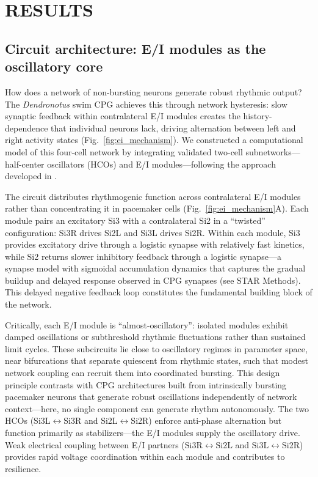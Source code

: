 \section*{RESULTS}

\subsection{Circuit architecture: E/I modules as the oscillatory core}

How does a network of non-bursting neurons generate robust rhythmic output?
The \textit{Dendronotus} swim CPG achieves this through network hysteresis: slow synaptic feedback within contralateral E/I modules creates the history-dependence that individual neurons lack, driving alternation between left and right activity states (Fig.~\ref{fig:ei_mechanism}).
We constructed a computational model of this four-cell network by integrating validated two-cell subnetworks---half-center oscillators (HCOs) and E/I modules---following the approach developed in \cite{scully2024pairing}.

The circuit distributes rhythmogenic function across contralateral E/I modules rather than concentrating it in pacemaker cells (Fig.~\ref{fig:ei_mechanism}A).
Each module pairs an excitatory Si3 with a contralateral Si2 in a ``twisted'' configuration: Si3R drives Si2L and Si3L drives Si2R.
Within each module, Si3 provides excitatory drive through a logistic synapse with relatively fast kinetics, while Si2 returns slower inhibitory feedback through a logistic synapse---a synapse model with sigmoidal accumulation dynamics that captures the gradual buildup and delayed response observed in CPG synapses (see STAR Methods).
This delayed negative feedback loop constitutes the fundamental building block of the network.

Critically, each E/I module is ``almost-oscillatory'': isolated modules exhibit damped oscillations or subthreshold rhythmic fluctuations rather than sustained limit cycles.
These subcircuits lie close to oscillatory regimes in parameter space, near bifurcations that separate quiescent from rhythmic states, such that modest network coupling can recruit them into coordinated bursting.
This design principle contrasts with CPG architectures built from intrinsically bursting pacemaker neurons that generate robust oscillations independently of network context---here, no single component can generate rhythm autonomously.
The two HCOs (Si3L$\leftrightarrow$Si3R and Si2L$\leftrightarrow$Si2R) enforce anti-phase alternation but function primarily as stabilizers---the E/I modules supply the oscillatory drive.
Weak electrical coupling between E/I partners (Si3R$\leftrightarrow$Si2L and Si3L$\leftrightarrow$Si2R) provides rapid voltage coordination within each module and contributes to resilience.

